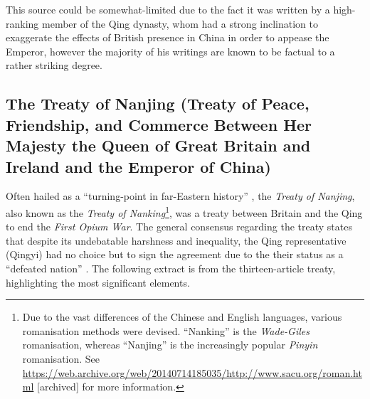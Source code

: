 \documentclass{article}
\begin{document}
        This source could be somewhat-limited due to the fact it was written by a high-ranking member of the Qing dynasty, whom had a strong inclination to exaggerate the effects of British presence in China in order to appease the Emperor, however the majority of his writings are known to be factual to a rather striking degree.

\subsection{The Treaty of Nanjing (Treaty of Peace, Friendship, and Commerce Between Her Majesty the Queen of Great Britain and Ireland and the Emperor of China)}

        Often hailed as a ``turning-point in far-Eastern history'' \autocite{Fairbank:1940}, the \textit{Treaty of Nanjing}, also known as the \textit{Treaty of Nanking}\footnote{Due to the vast differences of the Chinese and English languages, various romanisation methods were devised. ``Nanking'' is the \textit{Wade-Giles} romanisation, whereas ``Nanjing'' is the increasingly popular \textit{Pinyin} romanisation. See \url{https://web.archive.org/web/20140714185035/http://www.sacu.org/roman.html} [archived] for more information.}, was a treaty between Britain and the Qing to end the \textit{First Opium War}. The general consensus regarding the treaty states that despite its undebatable harshness and inequality, the Qing representative (Qingyi) had no choice but to sign the agreement due to the their status as a ``defeated nation''
\autocite{Mao:2018}. The following extract is from the thirteen-article treaty, highlighting the most significant elements.

\end{document}
